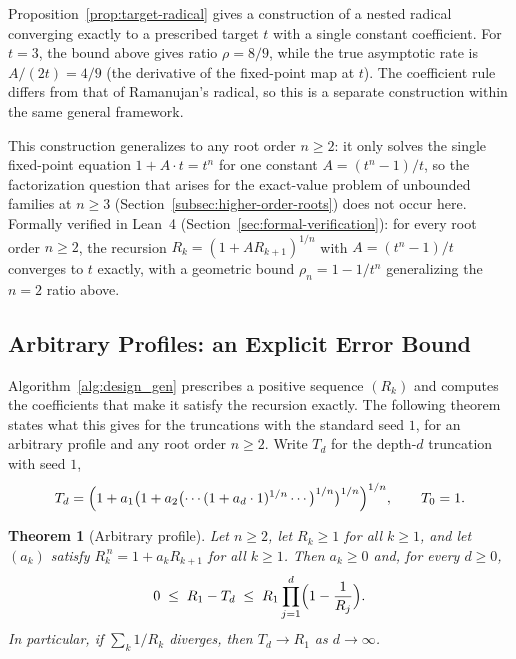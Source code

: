 \documentclass[11pt,a4paper]{amsart}
\theoremstyle{plain}
\newtheorem{theorem}{Theorem}
\theoremstyle{definition}
\theoremstyle{remark}
\begin{document}
Proposition~\ref{prop:target-radical} gives a construction of a nested radical converging exactly to a prescribed target $t$ with a single constant coefficient. For $t=3$, the bound above gives ratio $\rho = 8/9$, while the true asymptotic rate is $A/(2t) = 4/9$ (the derivative of the fixed-point map at $t$). The coefficient rule differs from that of Ramanujan's radical, so this is a separate construction within the same general framework.

This construction generalizes to any root order $n\ge 2$: it only solves the single fixed-point equation $1+A\cdot t=t^n$ for one constant $A=(t^n-1)/t$, so the factorization question that arises for the exact-value problem of unbounded families at $n\ge 3$ (Section~\ref{subsec:higher-order-roots}) does not occur here. Formally verified in Lean~4 (Section~\ref{sec:formal-verification}): for every root order $n\ge 2$, the recursion $R_k=(1+A R_{k+1})^{1/n}$ with $A=(t^n-1)/t$ converges to $t$ exactly, with a geometric bound $\rho_n=1-1/t^n$ generalizing the $n=2$ ratio above.

\subsection{Arbitrary Profiles: an Explicit Error Bound}
\label{subsec:profile}

Algorithm~\ref{alg:design_gen} prescribes a positive sequence $(R_k)$ and computes the coefficients that make it satisfy the recursion exactly. The following theorem states what this gives for the truncations with the standard seed $1$, for an arbitrary profile and any root order $n\ge 2$. Write $T_d$ for the depth-$d$ truncation with seed $1$,
\[
T_d=\Bigl(1+a_1\bigl(1+a_2\bigl(\cdots(1+a_d\cdot 1)^{1/n}\cdots\bigr)^{1/n}\bigr)^{1/n}\Bigr)^{1/n},\qquad T_0=1 .
\]

\begin{theorem}[Arbitrary profile]
\label{thm:profile}
Let $n\ge 2$, let $R_k\ge 1$ for all $k\ge 1$, and let $(a_k)$ satisfy $R_k^{\,n}=1+a_kR_{k+1}$ for all $k\ge 1$. Then $a_k\ge 0$ and, for every $d\ge 0$,
\[
0\;\le\; R_1-T_d\;\le\; R_1\prod_{j=1}^{d}\Bigl(1-\frac1{R_j}\Bigr).
\]
In particular, if $\sum_{k}1/R_k$ diverges, then $T_d\to R_1$ as $d\to\infty$.
\end{theorem}
\end{document}
